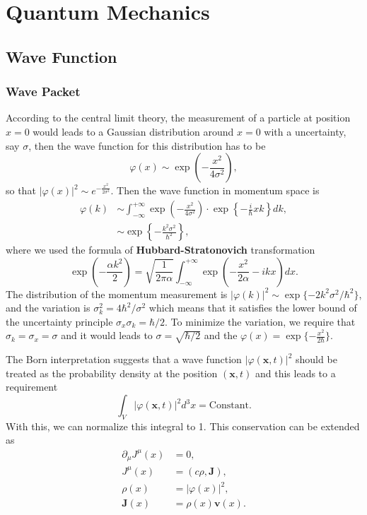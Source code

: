 \section{Quantum Mechanics}

\subsection{Wave Function}

\subsubsection{Wave Packet}

According to the central limit theory, the measurement of a particle at position $x=0$ would leads to a Gaussian distribution around $x=0$ with a uncertainty, say $\sigma$, then the wave function for this distribution has to be 
\begin{equation}
\varphi(x)\sim \exp\left(-\frac{x^2}{4\sigma^2}\right),
\end{equation}
so that $|\varphi(x)|^2\sim e^{-\frac{x^2}{2\sigma^2}}$. Then the wave function in momentum space is
\begin{equation}
\begin{aligned}
\varphi(k)&\sim\int_{-\infty}^{+\infty}\exp\left(-\frac{x^2}{4\sigma^2}\right)\cdot\exp\left\{-\frac{i}{\hbar}xk\right\}dk,\\
&\sim \exp\left\{-\frac{k^2\sigma^2}{\hbar^2}\right\},
\end{aligned}
\end{equation}
where we used the formula of \textbf{Hubbard-Stratonovich} transformation
\begin{equation}
\exp\left(-\frac{\alpha k^2}{2}\right)=\sqrt{\frac{1}{2\pi\alpha}}\int_{-\infty}^{+\infty}\exp\left(-\frac{x^2}{2\alpha}-ikx\right)dx.
\end{equation}
The distribution of the momentum measurement is $|\varphi(k)|^2\sim \exp\{-2k^2\sigma^2/\hbar^2\}$, and the variation is $\sigma_k^2= 4\hbar^2/\sigma^2$ which means that it satisfies the lower bound of the uncertainty principle $\sigma_x\sigma_k=\hbar/2$. To minimize the variation, we require that $\sigma_k=\sigma_x=\sigma$ and it would leads to $\sigma=\sqrt{\hbar/2}$ and the $\varphi(x)=\exp\{-\frac{x^2}{2\hbar}\}$.


The Born interpretation suggests that a wave function $|\varphi(\boldsymbol{x},t)|^2$ should be treated as the probability density at the position $(\boldsymbol{x},t)$ and this leads to a requirement
\begin{equation}
\int_V |\varphi(\boldsymbol{x},t)|^2d^3x=\text{Constant}.
\end{equation}
With this, we can normalize this integral to 1. This conservation can be extended as
\begin{equation}
\begin{aligned}
\partial_\mu J^\mu(x) &= 0,\\ 
J^\mu(x) &= (c\rho,\boldsymbol{J}),\\
\rho(x)&=|\varphi(x)|^2,\\
\boldsymbol{J}(x)&=\rho(x)\boldsymbol{v}(x).
\end{aligned}
\end{equation}


